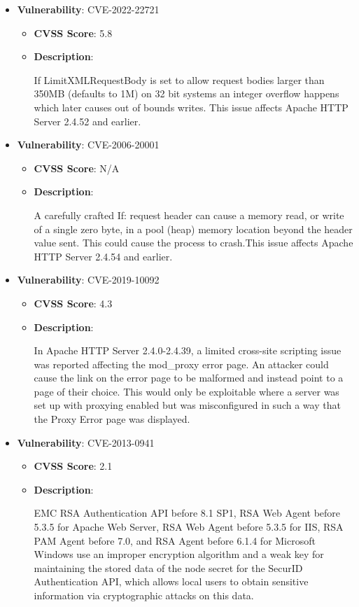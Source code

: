 \documentclass{article}
\begin{document}
\begin{itemize}
        \item \textbf{Vulnerability}: CVE-2022-22721
        \begin{itemize}
            \item \textbf{CVSS Score}:  5.8 
            \item \textbf{Description}:
            \parbox[t]{0.9\linewidth}{
                \ttfamily If LimitXMLRequestBody is set to allow request bodies larger than 350MB (defaults to 1M) on 32 bit systems an integer overflow happens which later causes out of bounds writes. This issue affects Apache HTTP Server 2.4.52 and earlier.
            }
        \end{itemize}
    
        \item \textbf{Vulnerability}: CVE-2006-20001
        \begin{itemize}
            \item \textbf{CVSS Score}:  N/A 
            \item \textbf{Description}:
            \parbox[t]{0.9\linewidth}{
                \ttfamily A carefully crafted If: request header can cause a memory read, or write of a single zero byte, in a pool (heap) memory location beyond the header value sent. This could cause the process to crash.This issue affects Apache HTTP Server 2.4.54 and earlier.
            }
        \end{itemize}
    
        \item \textbf{Vulnerability}: CVE-2019-10092
        \begin{itemize}
            \item \textbf{CVSS Score}:  4.3 
            \item \textbf{Description}:
            \parbox[t]{0.9\linewidth}{
                \ttfamily In Apache HTTP Server 2.4.0-2.4.39, a limited cross-site scripting issue was reported affecting the mod\_proxy error page. An attacker could cause the link on the error page to be malformed and instead point to a page of their choice. This would only be exploitable where a server was set up with proxying enabled but was misconfigured in such a way that the Proxy Error page was displayed.
            }
        \end{itemize}
    
        \item \textbf{Vulnerability}: CVE-2013-0941
        \begin{itemize}
            \item \textbf{CVSS Score}:  2.1 
            \item \textbf{Description}:
            \parbox[t]{0.9\linewidth}{
                \ttfamily EMC RSA Authentication API before 8.1 SP1, RSA Web Agent before 5.3.5 for Apache Web Server, RSA Web Agent before 5.3.5 for IIS, RSA PAM Agent before 7.0, and RSA Agent before 6.1.4 for Microsoft Windows use an improper encryption algorithm and a weak key for maintaining the stored data of the node secret for the SecurID Authentication API, which allows local users to obtain sensitive information via cryptographic attacks on this data.
            }
        \end{itemize}
    

\end{itemize}
\end{document}

